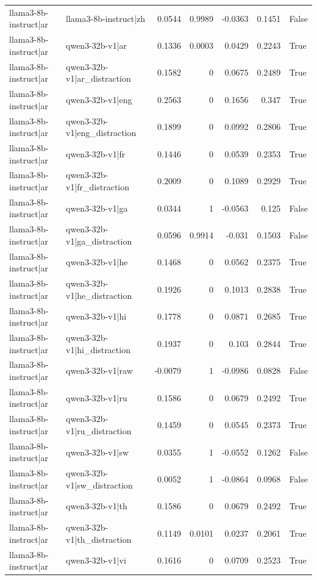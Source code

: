 \begin{table}
\begin{tabular}{l l r r r r l}
llama3-8b-instruct|ar & llama3-8b-instruct|zh & 0.0544 & 0.9989 & -0.0363 & 0.1451 & False \\
llama3-8b-instruct|ar & qwen3-32b-v1|ar & 0.1336 & 0.0003 & 0.0429 & 0.2243 & True \\
llama3-8b-instruct|ar & qwen3-32b-v1|ar_distraction & 0.1582 & 0 & 0.0675 & 0.2489 & True \\
llama3-8b-instruct|ar & qwen3-32b-v1|eng & 0.2563 & 0 & 0.1656 & 0.347 & True \\
llama3-8b-instruct|ar & qwen3-32b-v1|eng_distraction & 0.1899 & 0 & 0.0992 & 0.2806 & True \\
llama3-8b-instruct|ar & qwen3-32b-v1|fr & 0.1446 & 0 & 0.0539 & 0.2353 & True \\
llama3-8b-instruct|ar & qwen3-32b-v1|fr_distraction & 0.2009 & 0 & 0.1089 & 0.2929 & True \\
llama3-8b-instruct|ar & qwen3-32b-v1|ga & 0.0344 & 1 & -0.0563 & 0.125 & False \\
llama3-8b-instruct|ar & qwen3-32b-v1|ga_distraction & 0.0596 & 0.9914 & -0.031 & 0.1503 & False \\
llama3-8b-instruct|ar & qwen3-32b-v1|he & 0.1468 & 0 & 0.0562 & 0.2375 & True \\
llama3-8b-instruct|ar & qwen3-32b-v1|he_distraction & 0.1926 & 0 & 0.1013 & 0.2838 & True \\
llama3-8b-instruct|ar & qwen3-32b-v1|hi & 0.1778 & 0 & 0.0871 & 0.2685 & True \\
llama3-8b-instruct|ar & qwen3-32b-v1|hi_distraction & 0.1937 & 0 & 0.103 & 0.2844 & True \\
llama3-8b-instruct|ar & qwen3-32b-v1|raw & -0.0079 & 1 & -0.0986 & 0.0828 & False \\
llama3-8b-instruct|ar & qwen3-32b-v1|ru & 0.1586 & 0 & 0.0679 & 0.2492 & True \\
llama3-8b-instruct|ar & qwen3-32b-v1|ru_distraction & 0.1459 & 0 & 0.0545 & 0.2373 & True \\
llama3-8b-instruct|ar & qwen3-32b-v1|sw & 0.0355 & 1 & -0.0552 & 0.1262 & False \\
llama3-8b-instruct|ar & qwen3-32b-v1|sw_distraction & 0.0052 & 1 & -0.0864 & 0.0968 & False \\
llama3-8b-instruct|ar & qwen3-32b-v1|th & 0.1586 & 0 & 0.0679 & 0.2492 & True \\
llama3-8b-instruct|ar & qwen3-32b-v1|th_distraction & 0.1149 & 0.0101 & 0.0237 & 0.2061 & True \\
llama3-8b-instruct|ar & qwen3-32b-v1|vi & 0.1616 & 0 & 0.0709 & 0.2523 & True \\

\end{tabular}
\end{table}
